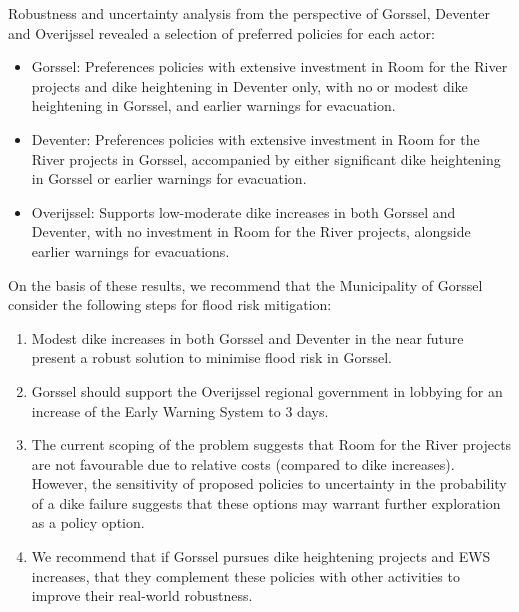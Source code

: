 \begin{multicols}{2}
\bigskip
\bigskip






Robustness and uncertainty analysis from the perspective of Gorssel, Deventer and Overijssel revealed a selection of preferred policies for each actor:
\begin{itemize}
    \item Gorssel: Preferences policies with extensive investment in Room for the River projects and dike heightening in Deventer only, with no or modest dike heightening in Gorssel, and earlier warnings for evacuation.
    \item Deventer: Preferences policies with extensive investment in Room for the River projects in Gorssel, accompanied by either significant dike heightening in Gorssel or earlier warnings for evacuation.
    \item Overijssel: Supports low-moderate dike increases in both Gorssel and Deventer, with no investment in Room for the River projects, alongside earlier warnings for evacuations.
\end{itemize}


On the basis of these results, we recommend that the Municipality of Gorssel consider the following steps for flood risk mitigation:
\begin{enumerate}
    \item Modest dike increases in both Gorssel and Deventer in the near future present a robust solution to minimise flood risk in Gorssel.
    \item Gorssel should support the Overijssel regional government in lobbying for an increase of the Early Warning System to 3 days.
    \item The current scoping of the problem suggests that Room for the River projects are not favourable due to relative costs (compared to dike increases). However, the sensitivity of proposed policies to uncertainty in the probability of a dike failure suggests that these options may warrant further exploration as a policy option.
    \item We recommend that if Gorssel pursues dike heightening projects and EWS increases, that they complement these policies with other activities to improve their real-world robustness.
\end{enumerate}

\end{multicols}